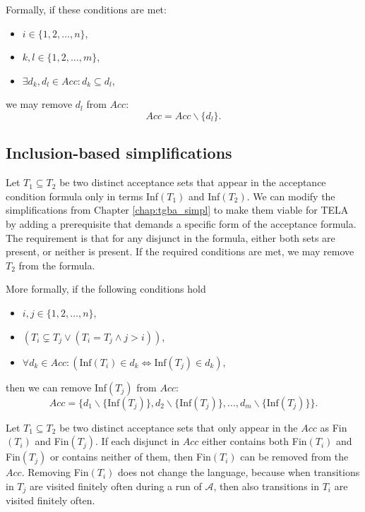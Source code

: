 \documentclass[
  digital, %
  twoside, %
  table,   %
  lof,     %
  lot,     %
]{fithesis3}
\begin{document}
Formally, if these conditions are met:
\begin{itemize}
  \item $i \in \{1,2, \dots, n\}$,
  \item $k,l \in \{1,2, \dots, m\}$,
  \item $\exists d_k, d_l \in Acc \colon d_k \subseteq d_l $,
\end{itemize}
we may remove $d_l$ from $Acc$:
\begin{equation*}
  Acc = Acc \smallsetminus \{d_l\}.
\end{equation*}

\subsection{Inclusion-based simplifications}
Let $T_1 \subseteq T_2$ be two distinct acceptance sets that appear in the acceptance condition formula only in terms Inf$(T_1)$ and Inf$(T_2)$. We can modify the simplifications from Chapter \ref{chap:tgba_simpl} to make them viable for TELA by adding a prerequisite that demands a specific form of the acceptance formula. The requirement is that for any disjunct in the formula, either both sets are present, or neither is present. If the required conditions are met, we may remove $T_2$ from the formula. 

More formally, if the following conditions hold
\begin{itemize}
  \item $i, j \in \{1, 2, \dots, n\}$,
  \item $(T_i \subsetneq T_j \vee (T_i = T_j \wedge j > i))$,
  \item $\forall d_k \in Acc \colon (\text{Inf}(T_i) \in d_k \Leftrightarrow \text{Inf}(T_j) \in d_k)$,
\end{itemize}
then we can remove Inf$(T_j)$ from $Acc$: 
\begin{equation*}
  Acc = \{d_1 \smallsetminus \{\text{Inf}(T_j)\}, d_2 \smallsetminus \{\text{Inf}(T_j)\}, \dots, d_m \smallsetminus \{\text{Inf}(T_j)\}\}.
\end{equation*} 

Let $T_1 \subseteq T_2$ be two distinct acceptance sets that only appear in the $Acc$ as Fin$(T_i)$ and Fin$(T_j)$. If each disjunct in $Acc$ either contains both Fin$(T_i)$ and Fin$(T_j)$ or contains neither of them, then Fin$(T_i)$ can be removed from the $Acc$.  Removing Fin$(T_i)$ does not change the language, because when transitions in $T_j$ are visited finitely often during a run of $\mathcal{A}$, then also transitions in $T_i$ are visited finitely often. 
\end{document}
